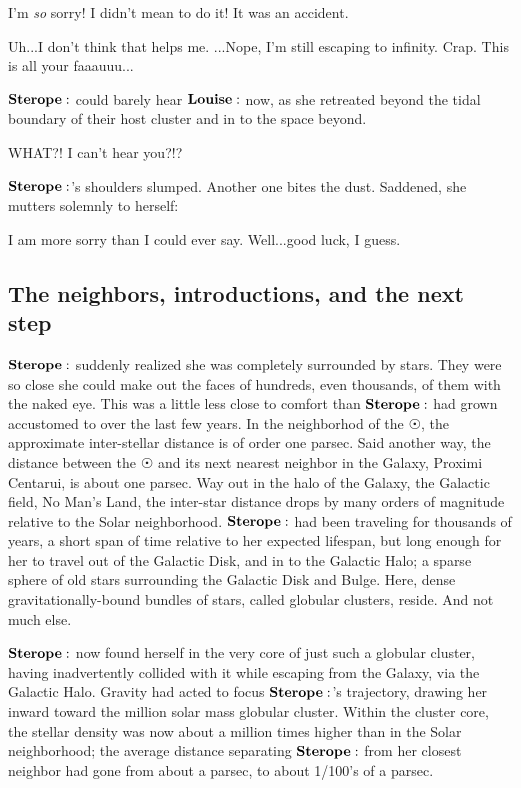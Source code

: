 \documentclass[main.tex]{subfiles}
\begin{document}
\Sterope I'm \textit{so} sorry!  I didn't mean to do it!  It was an accident.  

\Louise Uh...I don't think that helps me.  ...Nope, I'm still escaping to infinity.  Crap.  This is all your faaauuu...

$\Sterope$ could barely hear $\Louise$ now, as she retreated beyond the tidal boundary of their host cluster and in to the space beyond.  

\Sterope WHAT?! I can't hear you?!?

$\Sterope$'s shoulders slumped.  Another one bites the dust.  Saddened, she mutters solemnly to herself:

\Sterope I am more sorry than I could ever say.  Well...good luck, I guess.  

\subsection{The neighbors, introductions, and the next step}

$\Sterope$ suddenly realized she was completely surrounded by stars.  They were so close she could make out the faces of hundreds, even thousands, of them with the naked eye.  This was a little less close to comfort than $\Sterope$ had grown accustomed to over the last few years.  In the neighborhod of the $\Sun$, the approximate inter-stellar distance is of order one parsec.  Said another way, the distance between the $\Sun$ and its next nearest neighbor in the Galaxy, Proximi Centarui, is about one parsec.  Way out in the halo of the Galaxy, the Galactic field, No Man's Land, the inter-star distance drops by many orders of magnitude relative to the Solar neighborhood.  $\Sterope$ had been traveling for thousands of years, a short span of time relative to her expected lifespan, but long enough for her to travel out of the Galactic Disk, and in to the Galactic Halo; a sparse sphere of old stars surrounding the Galactic Disk and Bulge.  Here, dense gravitationally-bound bundles of stars, called globular clusters, reside.  And not much else.

$\Sterope$ now found herself in the very core of just such a globular cluster, having inadvertently collided with it while escaping from the Galaxy, via the Galactic Halo.  Gravity had acted to focus $\Sterope$'s trajectory, drawing her inward toward the million solar mass globular cluster.  Within the cluster core, the stellar density was now about a million times higher than in the Solar neighborhood; the average distance separating $\Sterope$ from her closest neighbor had gone from about a parsec, to about 1/100's of a parsec.  
\end{document}
